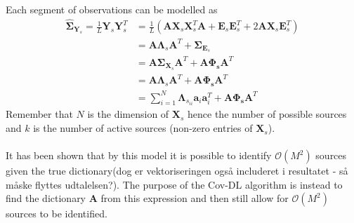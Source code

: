 \\ \\
Each segment of observations can be modelled as
\begin{align}\label{eq:cov_model}
\hat{\boldsymbol{\Sigma}}_{\mathbf{Y}_s} = \frac{1}{L}\mathbf{Y}_s \mathbf{Y}_s^T &= \frac{1}{L} \left( \mathbf{A} \mathbf{X}_s \mathbf{X}_s^T \mathbf{A} + \mathbf{E}_s \mathbf{E}_s^T + 2 \mathbf{A} \mathbf{X}_s \mathbf{E}_s^T \right) \nonumber \\
&= \mathbf{A} \boldsymbol{\Lambda}_s \mathbf{A}^T + \boldsymbol{\Sigma}_{\mathbf{E}_s} \nonumber \\
&= \mathbf{A} \boldsymbol{\Sigma}_{\mathbf{X}_s} \mathbf{A}^T + \mathbf{A} \boldsymbol{\Phi_s} \mathbf{A}^T  \nonumber \\
&= \mathbf{A} \boldsymbol{\Lambda}_s \mathbf{A}^T + \mathbf{A} \boldsymbol{\Phi_s} \mathbf{A}^T \nonumber \\
&= \sum_{i=1}^{N} \boldsymbol{\Lambda}_{s_{ii}} \textbf{a}_i\textbf{a}_i^{T} + \mathbf{A} \boldsymbol{\Phi_s} \mathbf{A}^T
\end{align}
Remember that $N$ is the dimension of $\mathbf{X}_s$ hence the number of possible sources and $k$ is the number of active sources (non-zero entries of $\mathbf{X}_s$).
\\ \\
 It has been shown that by this model it is possible to identify $\mathcal{O}(M^2)$ sources given the true dictionary\cite{Pal2015}(dog er vektoriseringen også includeret i resultatet - så måske flyttes udtalelsen?). The purpose of the Cov-DL algorithm is instead to find the dictionary $\textbf{A}$ from this expression and then still allow for $\mathcal{O}(M^2)$ sources to be identified.

